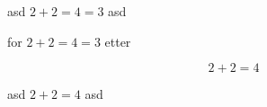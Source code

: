 \documentclass{minimal}
\begin{document}
asd $
2+2 = 4
= 3 $ asd

for $ 2+2 = 4 = 3 $ etter

\[
2+2 = 4
\]

asd $
2+2 = 4
$ asd
\end{document}

